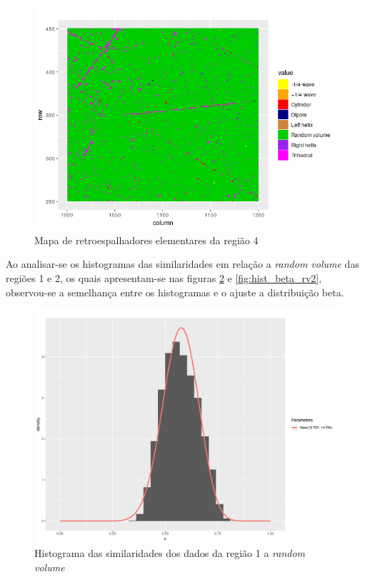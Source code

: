 \documentclass[12pt]{article}
\begin{document}
\begin{figure}[!h]

  \centering
  \includegraphics[width=\linewidth]{../../Images/Report_19_02_27/scatterer_map_region4.png}
  \caption{Mapa de retroespalhadores elementares da região 4}
  \label{fig:scatterer_map4}

\end{figure}

\newpage

Ao analisar-se os histogramas das similaridades em relação a \textit{random volume} das regiões 1 e 2, os quais apresentam-se nas figuras \ref{fig:hist_beta_rv1} e \ref{fig:hist_beta_rv2}, observou-se a semelhança entre os histogramas e o ajuste a distribuição beta. 


\begin{figure}[!h]

  \centering
  \includegraphics[width=0.8\linewidth]{../../Figures/Report_19_02_27/hist_rv_beta_region1.pdf}
  \caption{Histograma das similaridades dos dados da região 1 a \textit{random volume}}
  \label{fig:hist_beta_rv1}

\end{figure}
\end{document}
